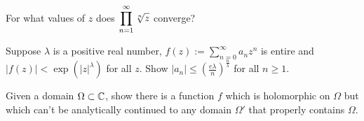\documentclass[bbb]{report}
\def\ds{\displaystyle}
\begin{document}
\begin{large}
\begin{description}
{\item[6.] For what values of $z$ does 
$\ds\prod^\infty_{n=1} \ds\root n \of z$ converge?

\vspace{.5in}

\item[7.] Suppose $\lambda$ is a positive real number, 
$f(z):=\ds\sum^\infty_{n=0} a_n z^n$ 
is entire and 
$|f(z)|<\exp(|z|^\lambda)$ for all $z$. 
Show 
$|a_n|\leq\left(\ds\frac{e\lambda}{n}\right)^{\frac{n}{\lambda}}$ 
for all $n\geq 1$. 

\vspace{.5in}

\item[8.] Given a domain $\Omega\subset{\Bbb C}$, show there is a 
function $f$ which is holomorphic on $\Omega$ but which can't be 
analytically continued to any domain 
$\Omega'$ that properly contains $\Omega$.


}
\end{description}

\end{large}
\end{document}
